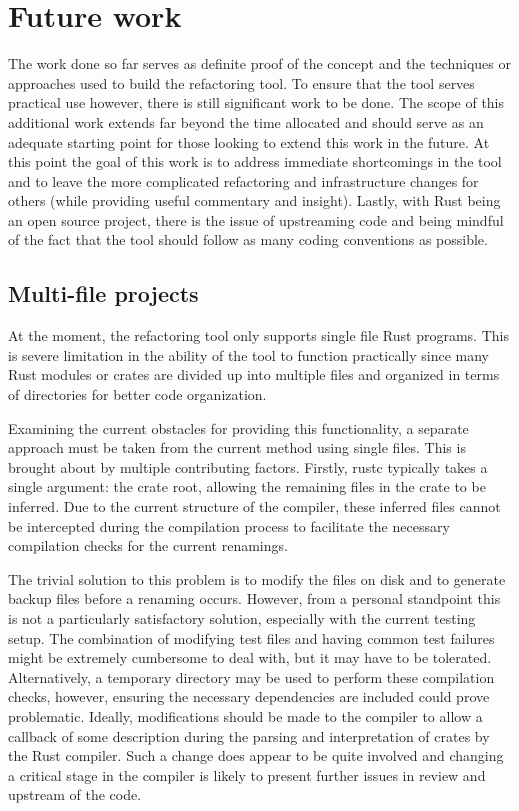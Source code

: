 \chapter{Future work}\label{C:future}
The work done so far serves as definite proof of the concept and the techniques or approaches used to build the refactoring tool. To ensure that the tool serves practical use however, there is still significant work to be done. The scope of this additional work extends far beyond the time allocated and should serve as an adequate starting point for those looking to extend this work in the future. At this point the goal of this work is to address immediate shortcomings in the tool and to leave the more complicated refactoring and infrastructure changes for others (while providing useful commentary and insight). Lastly, with Rust being an open source project, there is the issue of upstreaming code and being mindful of the fact that the tool should follow as many coding conventions as possible.

\section{Multi-file projects}
At the moment, the refactoring tool only supports single file Rust programs. This is severe limitation in the ability of the tool to function practically since many Rust modules or crates are divided up into multiple files and organized in terms of directories for better code organization.

Examining the current obstacles for providing this functionality, a separate approach must be taken from the current method using single files. This is brought about by multiple contributing factors. Firstly, rustc typically takes a single argument: the crate root, allowing the remaining files in the crate to be inferred. Due to the current structure of the compiler, these inferred files cannot be intercepted during the compilation process to facilitate the necessary compilation checks for the current renamings. 

The trivial solution to this problem is to modify the files on disk and to generate backup files before a renaming occurs. However, from a personal standpoint this is not a particularly satisfactory solution, especially with the current testing setup. The combination of modifying test files and having common test failures might be extremely cumbersome to deal with, but it may have to be tolerated. Alternatively, a temporary directory may be used to perform these compilation checks, however, ensuring the necessary dependencies are included could prove problematic. Ideally, modifications should be made to the compiler to allow a callback of some description during the parsing and interpretation of crates by the Rust compiler. Such a change does appear to be quite involved and changing a critical stage in the compiler is likely to present further issues in review and upstream of the code.

